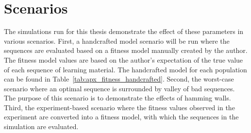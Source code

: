 \section{Scenarios}
The simulations run for this thesis demonstrate the effect of these parameters
in various scenarios. First, a handcrafted model scenario will be run where the
sequences are evaluated based on a fitness model manually created by the
author. The fitness model values are based on the author's expectation of the
true value of each sequence of learning material. The handcrafted model for
each population can be found in
Table~\ref{tab:apx_fitness_handcrafted}. Second, the worst-case scenario where
an optimal sequence is surrounded by valley of bad sequences. The purpose of
this scenario is to demonstrate the effects of hamming walls. Third, the
experiment-based scenario where the fitness values observed in the experiment
are converted into a fitness model, with which the sequences in the simulation
are evaluated.
